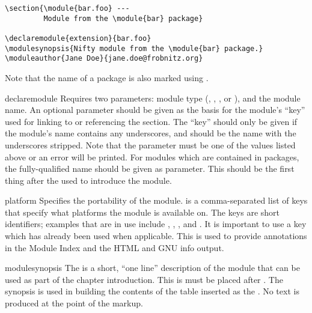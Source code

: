 \documentclass{howto}
\begin{document}
\begin{verbatim}
\section{\module{bar.foo} ---
         Module from the \module{bar} package}

\declaremodule{extension}{bar.foo}
\modulesynopsis{Nifty module from the \module{bar} package.}
\moduleauthor{Jane Doe}{jane.doe@frobnitz.org}
\end{verbatim}

  Note that the name of a package is also marked using
  .

  \begin{macrodesc}{declaremodule}{}
    Requires two parameters: module type (,
    , , or \samp{}), and the module
    name.  An optional parameter should be given as the basis for the
    module's ``key'' used for linking to or referencing the section.
    The ``key'' should only be given if the module's name contains any
    underscores, and should be the name with the underscores stripped.
    Note that the  parameter must be one of the values
    listed above or an error will be printed.  For modules which are
    contained in packages, the fully-qualified name should be given as
     parameter.  This should be the first thing after the
     used to introduce the module.
  \end{macrodesc}

  \begin{macrodesc}{platform}{}
    Specifies the portability of the module.   is a
    comma-separated list of keys that specify what platforms the
    module is available on.  The keys are short identifiers;
    examples that are in use include , ,
    , and .  It is important to use a key
    which has already been used when applicable.  This is used to
    provide annotations in the Module Index and the HTML and GNU info
    output.
  \end{macrodesc}

  \begin{macrodesc}{modulesynopsis}{}
    The  is a short, ``one line'' description of the
    module that can be used as part of the chapter introduction.
    This is must be placed after .
    The synopsis is used in building the contents of the table
    inserted as the .  No text is
    produced at the point of the markup.
  \end{macrodesc}
\end{document}
